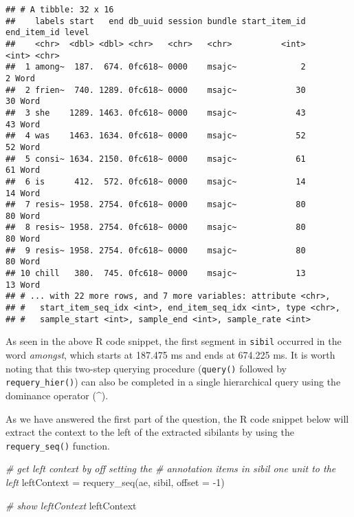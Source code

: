 \documentclass[
]{book}
\newenvironment{Shaded}{\begin{snugshade}}{\end{snugshade}}
\newcommand{\AttributeTok}[1]{\textcolor[rgb]{0.77,0.63,0.00}{#1}}
\newcommand{\CommentTok}[1]{\textcolor[rgb]{0.56,0.35,0.01}{\textit{#1}}}
\newcommand{\DecValTok}[1]{\textcolor[rgb]{0.00,0.00,0.81}{#1}}
\newcommand{\FunctionTok}[1]{\textcolor[rgb]{0.00,0.00,0.00}{#1}}
\newcommand{\NormalTok}[1]{#1}
\newcommand{\OtherTok}[1]{\textcolor[rgb]{0.56,0.35,0.01}{#1}}
\newcommand{\SpecialCharTok}[1]{\textcolor[rgb]{0.00,0.00,0.00}{#1}}
\begin{document}
\begin{verbatim}
## # A tibble: 32 x 16
##    labels start   end db_uuid session bundle start_item_id end_item_id level
##    <chr>  <dbl> <dbl> <chr>   <chr>   <chr>          <int>       <int> <chr>
##  1 among~  187.  674. 0fc618~ 0000    msajc~             2           2 Word 
##  2 frien~  740. 1289. 0fc618~ 0000    msajc~            30          30 Word 
##  3 she    1289. 1463. 0fc618~ 0000    msajc~            43          43 Word 
##  4 was    1463. 1634. 0fc618~ 0000    msajc~            52          52 Word 
##  5 consi~ 1634. 2150. 0fc618~ 0000    msajc~            61          61 Word 
##  6 is      412.  572. 0fc618~ 0000    msajc~            14          14 Word 
##  7 resis~ 1958. 2754. 0fc618~ 0000    msajc~            80          80 Word 
##  8 resis~ 1958. 2754. 0fc618~ 0000    msajc~            80          80 Word 
##  9 resis~ 1958. 2754. 0fc618~ 0000    msajc~            80          80 Word 
## 10 chill   380.  745. 0fc618~ 0000    msajc~            13          13 Word 
## # ... with 22 more rows, and 7 more variables: attribute <chr>,
## #   start_item_seq_idx <int>, end_item_seq_idx <int>, type <chr>,
## #   sample_start <int>, sample_end <int>, sample_rate <int>
\end{verbatim}

As seen in the above R code snippet, the first segment in \texttt{sibil} occurred in the word \emph{amongst}, which starts at 187.475 ms and ends at 674.225 ms. It is worth noting that this two-step querying procedure (\texttt{query()} followed by \texttt{requery\_hier()}) can also be completed in a single hierarchical query using the dominance operator (\^{}).

As we have answered the first part of the question, the R code snippet below will extract the context to the left of the extracted sibilants by using the \texttt{requery\_seq()} function.

\begin{Shaded}
\begin{Highlighting}[]
\CommentTok{\# get left context by off setting the }
\CommentTok{\# annotation items in sibil one unit to the left}
\NormalTok{leftContext }\OtherTok{=} \FunctionTok{requery\_seq}\NormalTok{(ae, sibil, }\AttributeTok{offset =} \SpecialCharTok{{-}}\DecValTok{1}\NormalTok{)}

\CommentTok{\# show leftContext}
\NormalTok{leftContext}
\end{Highlighting}
\end{Shaded}
\end{document}

